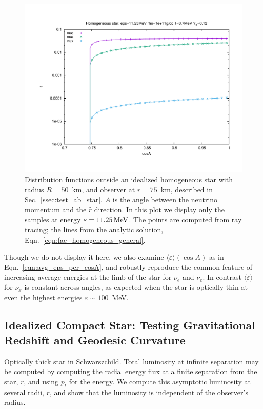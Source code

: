 \documentclass[aps,floatfix,prd,superscriptaddress,twocolumn]{revtex4-1}
\newcommand{\todo}[1]{\marginpar{\tiny{\textcolor{red}{#1}}}}
\renewcommand\todo[1]{} %
\begin{document}
\begin{figure}
  \includegraphics[width=\columnwidth]{fig-f-absorption_star-11MeV}
  \caption{Distribution functions outside an idealized homogeneous star
    with radius $R=50$~km, and observer at $r=75$~km,
    described in Sec.~\ref{ssec:test_ab_star}.
    $A$ is the angle between the neutrino momentum and the $\hat{r}$ direction.
    In this plot we display only the samples at energy
    $\varepsilon=11.25\,{\rm MeV}$.
    The points are computed from ray tracing; the lines from the analytic
    solution, Eqn.~\ref{eqn:fae_homogeneous_general}.
  }
  \label{fig:f_absorption_sphere}
\end{figure}

Though we do not display it here,
we also examine $\langle \varepsilon \rangle(\cos A)$
as in Eqn.~\ref{eqn:avg_eps_per_cosA}, and robustly reproduce the
common feature of increasing average energies at the limb of the star
for $\nu_e$ and $\bar{\nu}_e$. In contrast $\langle \varepsilon \rangle$
for $\nu_x$ is constant across angles, as expected when the star
is optically thin at even the highest energies $\varepsilon\sim100$~MeV.

\subsection{Idealized Compact Star:
  Testing Gravitational Redshift and Geodesic Curvature}
\label{ssec:test_gravity}
Optically thick star in Schwarszchild.
Total luminosity at infinite separation may be computed by
computing the radial energy flux at a finite separation from the star, $r$,
and using $p_t$ for the energy. We compute this asymptotic luminosity
at several radii, $r$, and show that the luminosity is independent of
the observer's radius.
\todo{compute $L$, put in figure}
\end{document}
